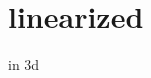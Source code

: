 \hypertarget{linearized-example}{}\section{linearized}

\begin{DoxyCodeInclude}{0}
\end{DoxyCodeInclude}
 in 3d


\begin{DoxyCodeInclude}{0}
\end{DoxyCodeInclude}
 
